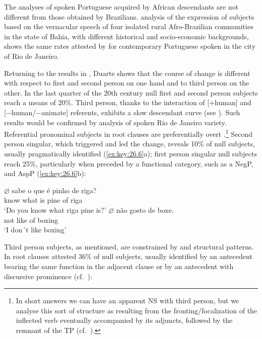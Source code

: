 \documentclass[output=paper]{langsci/langscibook}
\begin{document}
The analyses of spoken Portuguese acquired by  African descendants are not
different from those obtained by Brazilians.  analysis
of the expression of subjects based on the vernacular speech of four isolated
rural Afro-Brazilian communities in the state of Bahia, with different
historical and socio-economic backgrounds, shows the same rates attested by
\citet{Duarte1995} for contemporary Portuguese spoken in the city of Rio de
Janeiro.

Returning to the results in , Duarte shows that the course
of change is different with respect to first and  second person on one hand and
to third person on the other. In the last quarter of the 20th century null
first and second person subjects reach a means of 20\%. Third person, thanks to
the interaction of [+human] and [−human/−animate] referents, exhibits a slow
descendant curve (see \citealt{CyrinoEtAl2000}). Such results would be
confirmed by  analysis of spoken Rio de Janeiro variety.
Referential pronominal subjects in root clauses are preferentially overt
\parencite{Duarte1995}.\footnote{In short answers we can have an apparent NS
    with third person, but we analyse this sort of structure as resulting from
the fronting/focalization of the inflected verb eventually accompanied by its
adjuncts, followed by the remnant  of the TP (cf.\
\citealt{Kato2016}).} Second person singular, which triggered and led the
change, reveals 10\% of null subjects, usually pragmatically identified
(\ref{ex:key:26.6}a); first person singular null subjects reach 25\%,
particularly when preceded by a functional category, such as a NegP, and AspP
(\ref{ex:key:26.6}b):

\ea\label{ex:key:26.6}
    \ea
    \gll	$\varnothing$\tss{\Ssg} sabe {o que} é pinho de riga?\\
            {} know what is pine of riga\\
	\glt	‘Do you know what riga pine is?’
    \ex
	\gll	$\varnothing$\tss{\Fsg} não gosto de boxe.\\
            {} not like    of boxing\\
	\glt	‘I don´t like boxing’
    \z
\z

Third person subjects, as mentioned, are constrained by  and structural
patterns. In root clauses \citet{Duarte1995} attested 36\% of null subjects,
usually identified by an antecedent bearing the same function in the adjacent
clause or by an antecedent with discursive prominence (cf.\
\citealt{BarbosaDuarteKato2005,KatoDuarte2014b}):
\end{document}
